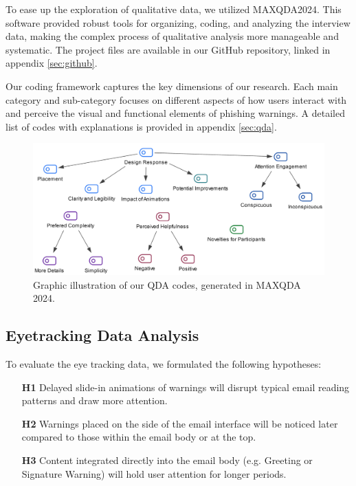 \documentclass[
  a4paper,  %
  twoside,  %
  bibliography=totoc,
  headsepline,
  cleardoublepage=empty,
  parskip=half,
  draft=false
]{scrbook}
\begin{document}
To ease up the exploration of qualitative data, we utilized MAXQDA2024. This software provided robust tools for organizing, coding, and analyzing the interview data, making the complex process of qualitative analysis more manageable and systematic. The project files are available in our GitHub repository, linked in appendix \ref{sec:github}.

Our coding framework captures the key dimensions of our research. Each main category and sub-category focuses on different aspects of how users interact with and perceive the visual and functional elements of phishing warnings. A detailed list of codes with explanations is provided in appendix \ref{sec:qda}. 

\begin{figure} [ht]
    \centering
    \includegraphics[width=0.9\linewidth]{figures/coding.png}
    \caption{Graphic illustration of our QDA codes, generated in MAXQDA 2024.}
    \label{fig:qda}
\end{figure}

\subsection{Eyetracking Data Analysis}
To evaluate the eye tracking data, we formulated the following hypotheses:

\begin{itemize}
    \item[\textbf{H1}] Delayed slide-in animations of warnings will disrupt typical email reading patterns and draw more attention.
    \item[\textbf{H2}] Warnings placed on the side of the email interface will be noticed later compared to those within the email body or at the top.
    \item[\textbf{H3}] Content integrated directly into the email body (e.g. Greeting or Signature Warning) will hold user attention for longer periods.
\end{itemize}
\end{document}
